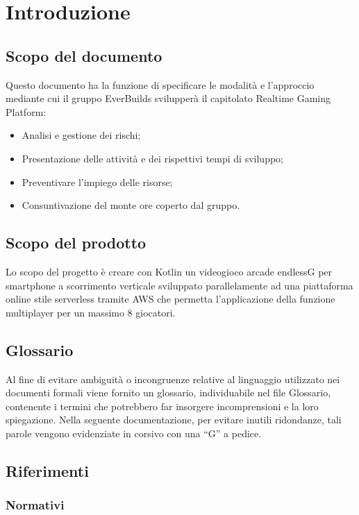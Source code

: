\section{Introduzione}

\subsection{Scopo del documento}

	Questo documento ha la funzione di specificare le modalità e l’approccio mediante cui il gruppo EverBuilds svilupperà il capitolato Realtime Gaming Platform:
	\begin{itemize}
		\item Analisi e gestione dei rischi;
		\item Presentazione delle attività e dei rispettivi tempi di sviluppo;
		\item Preventivare l’impiego delle risorse;
		\item Consuntivazione del monte ore coperto dal gruppo.
	\end{itemize}


\subsection{Scopo del prodotto}

	Lo scopo del progetto è creare con Kotlin un videogioco arcade endlessG per smartphone a scorrimento verticale sviluppato parallelamente ad una piattaforma online stile serverless tramite AWS che permetta l’applicazione della funzione multiplayer per un massimo 8 giocatori. 


\subsection{Glossario}

	Al fine di evitare ambiguità o incongruenze relative al linguaggio utilizzato nei documenti formali viene fornito un glossario, individuabile nel file Glossario, contenente i termini che potrebbero far insorgere incomprensioni e la loro spiegazione. 
	Nella seguente documentazione, per evitare inutili ridondanze, tali parole vengono evidenziate in corsivo con una “G” a pedice. 


\subsection{Riferimenti}

	\subsubsection{Normativi}

